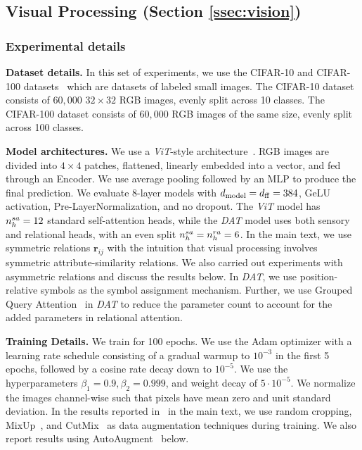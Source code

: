 \subsection{Visual Processing (Section \ref{ssec:vision})}\label{ssec:appendix_vision}

\subsubsection*{Experimental details}

\textbf{Dataset details.} In this set of experiments, we use the CIFAR-10 and CIFAR-100 datasets~\citep{cifar_dataset} which are datasets of labeled small images. The CIFAR-10 dataset consists of $60,000$ $32 \times 32$ RGB images, evenly split across 10 classes. The CIFAR-100 dataset consists of $60,000$ RGB images of the same size, evenly split across 100 classes.

\textbf{Model architectures.} We use a \textit{ViT}-style architecture~\citep{dosovitskiyImageWorth16x162020}. RGB images are divided into $4 \times 4$ patches, flattened, linearly embedded into a vector, and fed through an Encoder. We use average pooling followed by an MLP to produce the final prediction. We evaluate 8-layer models with $d_{\mathrm{model}} = d_{\mathrm{ff}} = 384$, GeLU activation, Pre-LayerNormalization, and no dropout. The \textit{ViT} model has $n_h^{sa} = 12$ standard self-attention heads, while the \textit{DAT} model uses both sensory and relational heads, with an even split $n_h^{sa} = n_h^{ra} = 6$. In the main text, we use symmetric relations $\bm{r}_{ij}$ with the intuition that visual processing involves symmetric attribute-similarity relations. We also carried out experiments with asymmetric relations and discuss the results below. In \textit{DAT}, we use position-relative symbols as the symbol assignment mechanism. Further, we use Grouped Query Attention~\citep{ainslie-etal-2023-gqa} in \textit{DAT} to reduce the parameter count to account for the added parameters in relational attention.

\textbf{Training Details.} We train for 100 epochs. We use the Adam optimizer with a learning rate schedule consisting of a gradual warmup to $10^{-3}$ in the first 5 epochs, followed by a cosine rate decay down to $10^{-5}$. We use the hyperparameters $\beta_1 = 0.9, \beta_2 = 0.999$, and weight decay of $5 \cdot 10^{-5}$. We normalize the images channel-wise such that pixels have mean zero and unit standard deviation. In the results reported in~ in the main text, we use random cropping, MixUp~\citep{zhang2018mixup}, and CutMix~\citep{yun2019cutmix} as data augmentation techniques during training. We also report results using AutoAugment~\citep{cubuk2019autoaugmentlearningaugmentationpolicies} below.

